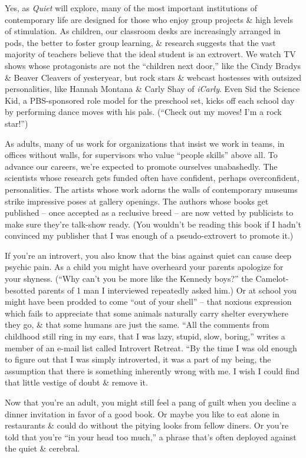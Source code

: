 \documentclass{article}
\numberwithin{equation}{section}
\begin{document}
Yes, as \textit{Quiet} will explore, many of the most important institutions of contemporary life are designed for those who enjoy group projects \& high levels of stimulation. As children, our classroom desks are increasingly arranged in pods, the better to foster group learning, \& research suggests that the vast majority of teachers believe that the ideal student is an extrovert. We watch TV shows whose protagonists are not the ``children next door,'' like the Cindy Bradys \& Beaver Cleavers of yesteryear, but rock stars \& webcast hostesses with outsized personalities, like Hannah Montana \& Carly Shay of \textit{iCarly}. Even Sid the Science Kid, a PBS-sponsored role model for the preschool set, kicks off each school day by performing dance moves with his pals. (``Check out my moves! I'm a rock star!'')

As adults, many of us work for organizations that insist we work in teams, in offices without walls, for supervisors who value ``people skills'' above all. To advance our careers, we're expected to promote ourselves unabashedly. The scientists whose research gets funded often have confident, perhaps overconfident, personalities. The artists whose work adorns the walls of contemporary museums strike impressive poses at gallery openings. The authors whose books get published -- once accepted as a reclusive breed -- are now vetted by publicists to make sure they're talk-show ready. (You wouldn't be reading this book if I hadn't convinced my publisher that I was enough of a pseudo-extrovert to promote it.)

If you're an introvert, you also know that the bias against quiet can cause deep psychic pain. As a child you might have overheard your parents apologize for your shyness. (``Why can't you be more like the Kennedy boys?'' the Camelot-besotted parents of 1 man I interviewed repeatedly asked him.) Or at school you might have been prodded to come ``out of your shell'' -- that noxious expression which fails to appreciate that some animals naturally carry shelter everywhere they go, \& that some humans are just the same. ``All the comments from childhood still ring in my ears, that I was lazy, stupid, slow, boring,'' writes a member of an e-mail list called Introvert Retreat. ``By the time I was old enough to figure out that I was simply introverted, it was a part of my being, the assumption that there is something inherently wrong with me. I wish I could find that little vestige of doubt \& remove it.

Now that you're an adult, you might still feel a pang of guilt when you decline a dinner invitation in favor of a good book. Or maybe you like to eat alone in restaurants \& could do without the pitying looks from fellow diners. Or you're told that you're ``in your head too much,'' a phrase that's often deployed against the quiet \& cerebral.
\end{document}
